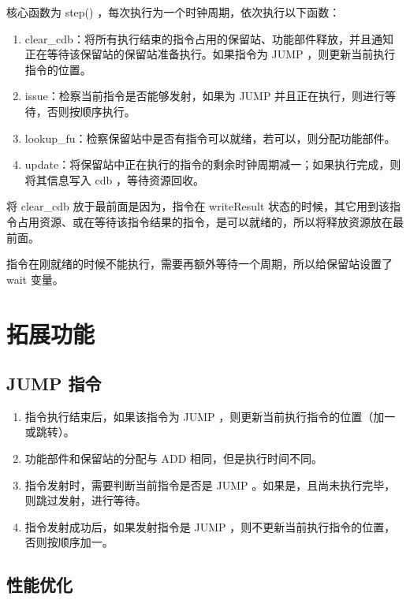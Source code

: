 \documentclass{article}
\begin{document}
核心函数为 step() ，每次执行为一个时钟周期，依次执行以下函数：


\begin{enumerate}
\item
clear\_cdb：将所有执行结束的指令占用的保留站、功能部件释放，并且通知正在等待该保留站的保留站准备执行。如果指令为 JUMP ，则更新当前执行指令的位置。
\item
issue：检察当前指令是否能够发射，如果为 JUMP 并且正在执行，则进行等待，否则按顺序执行。
\item
lookup\_fu：检察保留站中是否有指令可以就绪，若可以，则分配功能部件。
\item
update：将保留站中正在执行的指令的剩余时钟周期减一；如果执行完成，则将其信息写入 cdb ，等待资源回收。
\end{enumerate}



将 clear\_cdb 放于最前面是因为，指令在 writeResult 状态的时候，其它用到该指令占用资源、或在等待该指令结果的指令，是可以就绪的，所以将释放资源放在最前面。


指令在刚就绪的时候不能执行，需要再额外等待一个周期，所以给保留站设置了 wait 变量。


\section{拓展功能}




\subsection{JUMP 指令}




\begin{enumerate}
\item
指令执行结束后，如果该指令为 JUMP ，则更新当前执行指令的位置（加一或跳转）。
\item
功能部件和保留站的分配与 ADD 相同，但是执行时间不同。
\item
指令发射时，需要判断当前指令是否是 JUMP 。如果是，且尚未执行完毕，则跳过发射，进行等待。
\item
指令发射成功后，如果发射指令是 JUMP ，则不更新当前执行指令的位置，否则按顺序加一。
\end{enumerate}



\subsection{性能优化}
\end{document}
